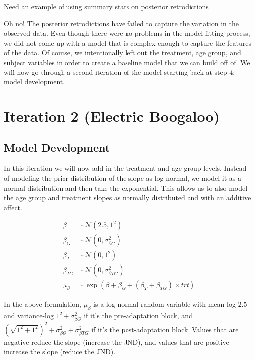 \documentclass[11pt, oneside, openany]{scrbook}
\begin{document}
Need an example of using summary stats on posterior retrodictions

Oh no! The posterior retrodictions have failed to capture the variation in the observed data. Even though there were no problems in the model fitting process, we did not come up with a model that is complex enough to capture the features of the data. Of course, we intentionally left out the treatment, age group, and subject variables in order to create a baseline model that we can build off of. We will now go through a second iteration of the model starting back at step 4: model development.

\hypertarget{iteration-2-electric-boogaloo}{%
\section{Iteration 2 (Electric Boogaloo)}\label{iteration-2-electric-boogaloo}}

\hypertarget{mod-dev-iter2}{%
\subsection{Model Development}\label{mod-dev-iter2}}

In this iteration we will now add in the treatment and age group levels. Instead of modeling the prior distribution of the slope as log-normal, we model it as a normal distribution and then take the exponential. This allows us to also model the age group and treatment slopes as normally distributed and with an additive affect.

\begin{align*}
\beta &\sim \mathcal{N}(2.5, 1^2) \\
\beta_G &\sim \mathcal{N}(0, \sigma_{\beta G}^2) \\
\beta_T &\sim \mathcal{N}(0, 1^2) \\
\beta_{TG} &\sim \mathcal{N}(0, \sigma_{\beta TG}^2) \\
\mu_\beta &\sim \exp(\beta + \beta_G + (\beta_T + \beta_{TG})\times trt)
\end{align*}

In the above formulation, \(\mu_\beta\) is a log-normal random variable with mean-log \(2.5\) and variance-log \(1^2 + \sigma_{\beta G}^2\) if it's the pre-adaptation block, and \(\left(\sqrt{1^2 + 1^2}\right)^2 + \sigma_{\beta G}^2 + \sigma_{\beta TG}^2\) if it's the post-adaptation block. Values that are negative reduce the slope (increase the JND), and values that are positive increase the slope (reduce the JND).
\end{document}
